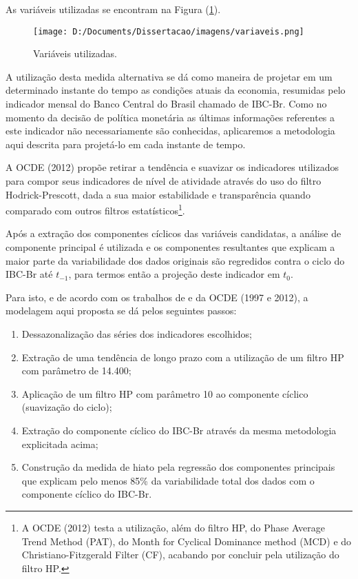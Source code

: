 \documentclass[
	article,			%
	11pt,				%
	oneside,			%
	a4paper,			%
	english,			%
	brazil,				%
	]{abntex2}
\begin{document}
	As variáveis utilizadas se encontram na Figura (\ref{fig:variaveis}).
	
	\hfill \break
	\hfill \break
	\hfill \break
	\hfill \break
	\hfill \break
	\hfill \break
	\hfill \break
	\hfill \break
	\hfill \break
	\hfill \break
	\hfill \break
	\hfill \break
	\hfill \break
	
	\begin{figure}[!h]
	\texttt{[image: D:/Documents/Dissertacao/imagens/variaveis.png]}
	\caption{Variáveis utilizadas.}
	\label{fig:variaveis}
	\end{figure}
	
	A utilização desta medida alternativa se dá como maneira de projetar em um determinado instante do tempo as condições atuais da economia, resumidas pelo indicador mensal do Banco Central do Brasil chamado de IBC-Br. Como no momento da decisão de política monetária as últimas informações referentes a este indicador não necessariamente são conhecidas, aplicaremos a metodologia aqui descrita para projetá-lo em cada instante de tempo.
	
	A OCDE (2012) propõe retirar a tendência e suavizar os indicadores utilizados para compor seus indicadores de nível de atividade através do uso do filtro Hodrick-Prescott, dada a sua maior estabilidade e transparência quando comparado com outros filtros estatísticos\footnote{A OCDE (2012) testa a utilização, além do filtro HP, do Phase Average Trend Method (PAT), do Month for Cyclical Dominance method (MCD) e do Christiano-Fitzgerald Filter (CF), acabando por concluir pela utilização do filtro HP.}.
	
	Após a extração dos componentes cíclicos das variáveis candidatas, a análise de componente principal é utilizada e os componentes resultantes que explicam a maior parte da variabilidade dos dados originais são regredidos contra o ciclo do IBC-Br até $t_{-1}$, para termos então a projeção deste indicador em $t_0$.
	
	Para isto, e de acordo com os trabalhos de  e da OCDE (1997 e 2012), a modelagem aqui proposta se dá pelos seguintes passos:
	
	\begin{enumerate}
		\item Dessazonalização das séries dos indicadores escolhidos;
		\item Extração de uma tendência de longo prazo com a utilização de um filtro HP com parâmetro de 14.400;
		\item Aplicação de um filtro HP com parâmetro 10 ao componente cíclico (suavização do ciclo);
		\item Extração do componente cíclico do IBC-Br através da mesma metodologia explicitada acima;
		\item Construção da medida de hiato pela regressão dos componentes principais que explicam pelo menos 85\% da variabilidade total dos dados com o componente cíclico do IBC-Br.
	\end{enumerate}
	
\end{document}
